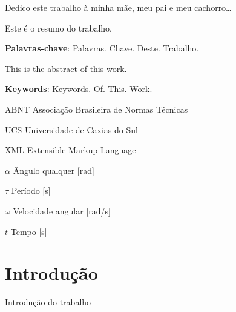 \documentclass[12pt,oneside,english,brazil,lmodern]{ucsmonograph}
\begin{document}
	\imprimircapa
	\imprimirfolhaderosto
	
	
	\begin{dedicatoria}
		Dedico este trabalho à minha mãe, meu pai e meu cachorro\dots
	\end{dedicatoria}

	\begin{resumo}
		\SingleSpacing
		Este é o resumo do trabalho.
		\vspace{\onelineskip}
		
		\noindent
		\textbf{Palavras-chave}: Palavras. Chave. Deste. Trabalho.
	\end{resumo}
	
	\begin{resumo}[Abstract]
		\SingleSpacing
		This is the abstract of this work.
		\vspace{\onelineskip}
		
		\noindent
		\textbf{Keywords}: Keywords. Of. This. Work.
	\end{resumo}
	
	\listoffigures*
	\cleardoublepage
		
	\listofquadros*
	\cleardoublepage
	
	\listoftables*
	\cleardoublepage
	
	\begin{siglas} %
		\item[ABNT] Associação Brasileira de Normas Técnicas
		\item[UCS] Universidade de Caxias do Sul
		\item[XML] \foreignlanguage{english}{Extensible Markup Language}
	\end{siglas}

	\begin{simbolos}
		\item[\ensuremath{\alpha}] Ângulo qualquer [rad]
		\item[\ensuremath{\tau}] Período [s]
		\item[\ensuremath{\omega}] Velocidade angular [rad/s]
		\item[\ensuremath{t}] Tempo [s]
	\end{simbolos}

	\tableofcontents*
	
	\textual %
	
	\chapter{Introdução}
	Introdução do trabalho
	
\end{document}
